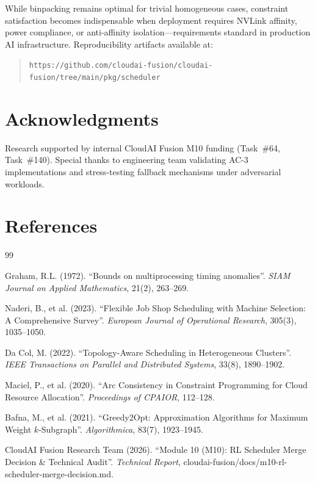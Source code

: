 \documentclass[11pt, twoside]{article}
\begin{document}
While binpacking remains optimal for trivial homogeneous cases, constraint satisfaction becomes indispensable when deployment requires NVLink affinity, power compliance, or anti-affinity isolation—requirements standard in production AI infrastructure. Reproducibility artifacts available at:
\begin{quote}
\texttt{https://github.com/cloudai-fusion/cloudai-fusion/tree/main/pkg/scheduler}
\end{quote}

\section*{Acknowledgments}

Research supported by internal CloudAI Fusion M10 funding (Task~\#64, Task~\#140). Special thanks to engineering team validating AC-3 implementations and stress-testing fallback mechanisms under adversarial workloads.

\section*{References}

\begin{thebibliography}{99}

Graham, R.L. (1972). ``Bounds on multiprocessing timing anomalies''. \emph{SIAM Journal on Applied Mathematics}, 21(2), 263--269.

Naderi, B., et al. (2023). ``Flexible Job Shop Scheduling with Machine Selection: A Comprehensive Survey''. \emph{European Journal of Operational Research}, 305(3), 1035--1050.

Da Col, M. (2022). ``Topology-Aware Scheduling in Heterogeneous Clusters''. \emph{IEEE Transactions on Parallel and Distributed Systems}, 33(8), 1890--1902.

Maciel, P., et al. (2020). ``Arc Consistency in Constraint Programming for Cloud Resource Allocation''. \emph{Proceedings of CPAIOR}, 112--128.

Bafna, M., et al. (2021). ``Greedy2Opt: Approximation Algorithms for Maximum Weight $k$-Subgraph''. \emph{Algorithmica}, 83(7), 1923--1945.

CloudAI Fusion Research Team (2026). ``Module 10 (M10): RL Scheduler Merge Decision \& Technical Audit''. \emph{Technical Report}, cloudai-fusion/docs/m10-rl-scheduler-merge-decision.md.

\end{thebibliography}
\end{document}
